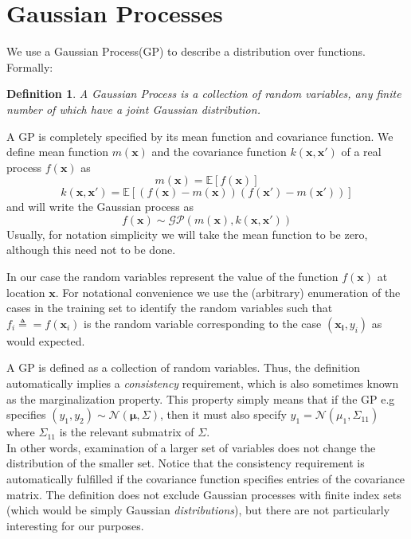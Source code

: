 \documentclass[twoside]{article}
\newtheorem{definition}[theorem]{Definition}
\begin{document}
\section{Gaussian Processes}
We use a Gaussian Process(GP) to describe a distribution over functions. Formally:
\begin{definition}
A Gaussian Process is a collection of random variables, any finite number of which have a joint Gaussian distribution.
\end{definition}
A GP is completely specified by its mean function and covariance function. We define mean function $m(\boldsymbol{x})$ and the covariance function $k(\boldsymbol{x}, \boldsymbol{x'})$ of a real process $f(\boldsymbol{x})$ as
\begin{equation*}
    m(\boldsymbol{x}) = \mathbb{E}[f(\boldsymbol{x})]
\end{equation*}
\begin{equation*}
    k(\boldsymbol{x}, \boldsymbol{x'}) = \mathbb{E}[(f(\boldsymbol{x}) - m(\boldsymbol{x}))(f(\boldsymbol{x'}) - m(\boldsymbol{x'}))]
\end{equation*}
and will write the Gaussian process as
\begin{equation*}
    f(\boldsymbol{x}) \sim \mathcal{GP}(m(\boldsymbol{x}), k(\boldsymbol{x}, \boldsymbol{x'}))
\end{equation*}
Usually, for notation simplicity we will take the mean function to be zero, although this need not to be done.\medskip

In our case the random variables represent the value of the function $f(\boldsymbol{x})$ at location $\boldsymbol{x}$. For notational convenience we use the (arbitrary) enumeration of the cases in the training set to identify the random variables such that $f_i \triangleq = f(\boldsymbol{x}_i)$ is the random variable corresponding to the case $(\boldsymbol{x_i}, y_i)$ as would expected.\medskip

A GP is defined as a collection of random variables. Thus, the definition automatically implies a \textit{consistency} requirement, which is also sometimes known as the marginalization property. This property simply means that if the GP e.g specifies $(y_1, y_2) \sim \mathcal{N}(\boldsymbol{\mu}, \Sigma)$, then it must also specify $y_1 = \mathcal{N}(\mu_1, \Sigma_{11})$ where $ \Sigma_{11}$ is the relevant submatrix of $\Sigma$.\\
In other words, examination of a larger set of variables does not change the distribution of the smaller set. Notice that the consistency requirement is automatically fulfilled if the covariance function specifies entries of the covariance matrix. The definition does not exclude Gaussian processes with finite index sets (which would be simply Gaussian \textit{distributions}), but there are not particularly interesting for our purposes.\medskip
\end{document}
